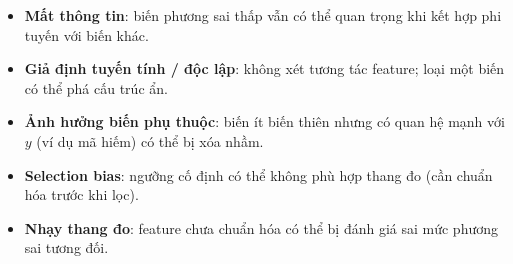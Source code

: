 \begin{luuy}[title={Nhược điểm}]
\begin{itemize}
  \item \textbf{Mất thông tin}: biến phương sai thấp vẫn có thể quan trọng khi kết hợp phi tuyến với biến khác.
  \item \textbf{Giả định tuyến tính / độc lập}: không xét tương tác feature; loại một biến có thể phá cấu trúc ẩn.
  \item \textbf{Ảnh hưởng biến phụ thuộc}: biến ít biến thiên nhưng có quan hệ mạnh với $y$ (ví dụ mã hiếm) có thể bị xóa nhầm.
  \item \textbf{Selection bias}: ngưỡng cố định có thể không phù hợp thang đo (cần chuẩn hóa trước khi lọc).
  \item \textbf{Nhạy thang đo}: feature chưa chuẩn hóa có thể bị đánh giá sai mức phương sai tương đối.
\end{itemize}
\end{luuy}
